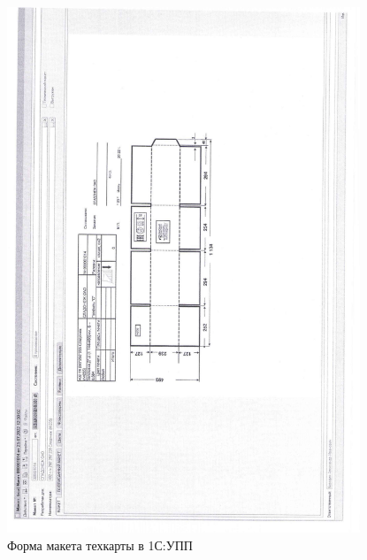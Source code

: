 \clearpage



\begin{figure}
\begin{center}
  \includegraphics[height=0.94\textheight, width=0.94\textwidth, keepaspectratio]{Pics/d08.jpg}
\end{center}
  \caption{Форма макета техкарты в 1С:УПП}
  \label{pic:d8}
\end{figure}


